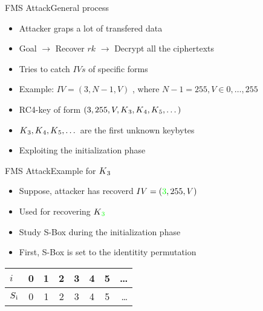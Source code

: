 \documentclass[
	aspectratio=169,	%
	onlytextwidth,		%
	t					%
	]{beamer}
\begin{document}
\begin{frame}[fragile]{FMS Attack}{General process}
	\begin{itemize}
		\item Attacker graps a lot of transfered data
		\item Goal $\rightarrow$ Recover $rk$ $\rightarrow$ Decrypt all the ciphertexts
		\item Tries to catch $IVs$ of specific forms 
		\item Example: $ IV = (3, N-1, V)$ , where $N-1 = 255, V \in {0,\dots,255}$
		\item RC4-key of form $(3, 255, V, K\textsubscript{3}, K\textsubscript{4},K\textsubscript{5}, \dots)$
		\item $K\textsubscript{3}, K\textsubscript{4},K\textsubscript{5},\dots$ are the first unknown keybytes
		\item Exploiting the initialization phase
	\end{itemize}
\end{frame}

\begin{frame}[fragile]{FMS Attack}{Example for $K\textsubscript{3}$}
	\begin{itemize}
		\item Suppose, attacker has recoverd $IV = (\textcolor{green}{3}, 255, V)$ 
		\item Used for recovering $K\textsubscript{\textcolor{green}{3}}$
		\item Study S-Box during the initialization phase
		\item First, S-Box is set to the identitity permutation
	\end{itemize}
	\medskip
	\begin{table}[h!]
		\begin{center}
		  \begin{tabular}{l|c|c|c|c|c|c|r}
			$i$ & 0 & 1 & 2 & 3 & 4 & 5 & \dots\\
			\hline
			$S\textsubscript{i}$ & 0 & 1 & 2 & 3 & 4 & 5 & \dots\\
		  \end{tabular}
		\end{center}
	\end{table}
\end{frame}
\end{document}
